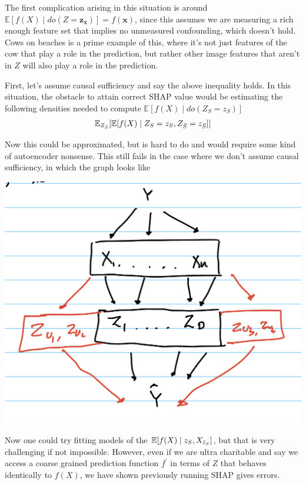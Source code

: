 \documentclass{article}
\begin{document}
The first complication arising in this situation is around $\mathbb{E}[f(X) \mid do(Z = \mathbf{z}_{\mathbf{x}})] = f(\mathbf{x})$, since this assumes we are measuring a rich enough feature set that implies no unmeasured confounding, which doesn't hold. Cows on beaches is a prime example of this, where it's not just features of the cow that play a role in the prediction, but rather other image features that aren't in $Z$ will also play a role in the prediction.

First, let's assume causal sufficiency and say the above inequality holds. In this situation, the obstacle to attain correct SHAP value would be estimating the following densities needed to compute $\mathbb{E}[f(X) \mid do(Z_S = z_S) ]$
\begin{align*}
\mathbb{E}_{Z_{\Bar{S}}}[\mathbb{E}[f(X) \mid Z_S = z_S, Z_{\Bar{S}} = z_{\Bar{S}}]]
\end{align*}

Now this could be approximated, but is hard to do and would require some kind of autoencoder nonsense. This still fails in the case where we don't assume causal sufficiency, in which the graph looks like
\begin{center}
\includegraphics[scale=0.2]{Z_after_X_no_sufficiency.jpeg}
\end{center}

Now one could try fitting models of the $\mathbb{E}[f(X) \mid z_S, X_{\Bar{z}_S}]$, but that is very challenging if not impossible. However, even if we are ultra charitable and say we access a coarse grained prediction function $f^\prime$ in terms of $Z$ that behaves identically to $f(X)$, we have shown previously running SHAP gives errors. 
\end{document}
